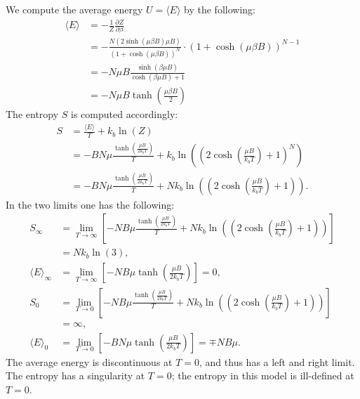 \documentclass[a4paper]{article}
\newcommand{\average}[1]{\langle #1 \rangle}
\newcommand{\newparagraph}{\vspace{.5cm}\noindent}
\begin{document}
\newparagraph
\begin{comment}
\begin{align*}
    \average{E} &= -\frac{N(2\sinh(\mu\beta B)\mu B)}{(1+\cosh(\mu\beta B))^N}\cdot (1+\cosh(\mu\beta B))^{N-1}\\
    &= -\frac{N2\sinh(\mu\beta B)\mu B}{1+\cosh(\mu\beta B)}\\
    &= -N\mu B \tanh\left(\frac{\mu\beta B}{2}\right)
\end{align*}
\end{comment}
We compute the average energy $U = \average{E}$ by the following:
\begin{align*}
    \average{E} &= -\frac{1}{Z}\frac{\partial Z}{\partial \beta}\\
    &= -\frac{N(2\sinh(\mu\beta B)\mu B)}{(1+\cosh(\mu\beta B))^N}\cdot (1+\cosh(\mu\beta B))^{N-1}\\
    &= -N\mu B\frac{\sinh\left(\beta\mu B\right)}{\cosh(\beta\mu B) + 1}\\
    &= -N\mu B \tanh\left(\frac{\mu\beta B}{2}\right)
\end{align*}
The entropy $S$ is computed accordingly:
\begin{align*}
    S &= \frac{\average{E}}{T} + k_b\ln\left(Z\right)\\
    &= -BN\mu\frac{\tanh\left(\frac{\mu B}{2k_bT}\right)}{T} + k_b\ln\left(\left(2\cosh\left(\frac{\mu B}{k_bT}\right) + 1\right)^N\right)\\
    &= -BN\mu\frac{\tanh\left(\frac{\mu B}{2k_bT}\right)}{T} + Nk_b\ln\left(\left(2\cosh\left(\frac{\mu B}{k_bT}\right) + 1\right)\right).
\end{align*}
In the two limits one has the following:
\begin{align*}
    S_\infty &= \lim_{T\to\infty}\left[ -NB\mu\frac{\tanh\left(\frac{\mu B}{2k_bT}\right)}{T} + Nk_b\ln\left(\left(2\cosh\left(\frac{\mu B}{k_bT}\right) + 1\right)\right)\right]\\
    &=Nk_b\ln\left(3\right),\\
    \average{E}_\infty &=\lim_{T\to\infty}\left[-NB\mu\tanh\left(\frac{\mu B}{2k_bT}\right)\right] = 0,\\
    S_0 &= \lim_{T\to0}\left[ -NB\mu\frac{\tanh\left(\frac{\mu B}{2k_bT}\right)}{T} + Nk_b\ln\left(\left(2\cosh\left(\frac{\mu B}{k_bT}\right) + 1\right)\right)\right]\\
    &= \infty,\\
    \average{E}_0 &= \lim_{T\to0}\left[-BN\mu\tanh\left(\frac{\mu B}{2k_bT}\right)\right] = \mp NB\mu.
\end{align*}The average energy is discontinuous at $T=0$, and thus has a left and right limit. The entropy has a singularity at $T=0$; the entropy in this model is ill-defined at $T=0$. 
\end{document}
